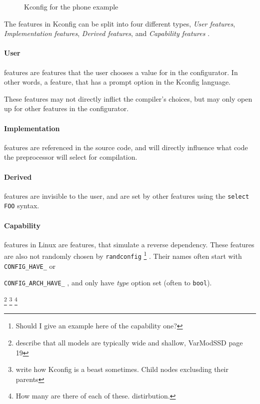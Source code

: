 \documentclass[a4paper,11pt]{report}
\newcommand{\textcode}[1]{
    \fboxsep=1pt
    \texttt{\colorbox{gray!20}{#1}}
}
\newcommand{\figa}{
    \begin{figure}[!htpb]
    \centering
}
\newcommand{\figb}[2]{
    \caption{#1}
    \label{#2}
    \end{figure}
}
\begin{document}
\figa
    
\figb{Kconfig for the phone example}{kconfigphone}

        {\color{gray}
The features in Kconfig can be split into four different types, \emph{User 
features}, \emph{Implementation features}, \emph{Derived features}, and 
\emph{Capability features}
    \cite[p. 8]{VarModSSD}
.
\\ 

\paragraph{User} features are features that the user chooses a value for in the 
configurator. In other words, a feature, that has a prompt option in the 
Kconfig language. 

These features may not directly inflict the compiler's choices, but may only 
open up for other features in the configurator.

\paragraph{Implementation} features are referenced in the source code, and will 
directly influence what code the preprocessor will select for compilation.

\paragraph{Derived} features are invisible to the user, and are set by other 
features using the \textcode{select FOO} syntax.

\paragraph{Capability} features in Linux are features, that simulate a reverse 
dependency. These features are also not randomly chosen by 
    \texttt{randconfig}
        \footnote{Should I give an example here of the capability one?}
    . Their names often start with \textcode{CONFIG\_HAVE\_} or 
    \textcode{CONFIG\_ARCH\_HAVE\_}, and only have \emph{type} option set (often to 
    \texttt{bool}).
            } %

        \footnote{describe that all models are typically wide and shallow, 
        VarModSSD page 19}
        \footnote{write how Kconfig is a beast sometimes. Child nodes exclusding 
        their parents}
        \footnote{How many are there of each of these. distirbution.}
\end{document}
